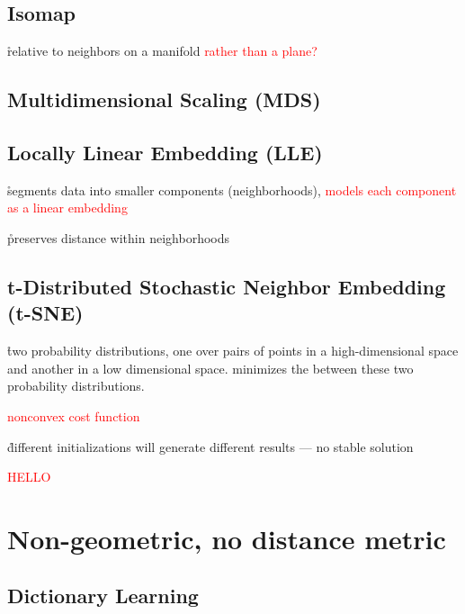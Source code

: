 \subsection{Isomap}


\r{relative to neighbors on a manifold \textcolor{red}{rather than a plane?}}

\subsection{Multidimensional Scaling (MDS)}


\subsection{Locally Linear Embedding (LLE)}

\r{segments data into smaller components (neighborhoods), \textcolor{red}{models each component as a linear embedding}}

\r{preserves distance within neighborhoods}


\subsection{t-Distributed Stochastic Neighbor Embedding (t-SNE)}




\r{two probability distributions, one over pairs of points in a high-dimensional space and another in a low dimensional space. minimizes the  between these two probability distributions.}


\textcolor{red}{nonconvex cost function}

\r{different initializations will generate different results --- no stable solution}

\textcolor{red}{HELLO}

\section{Non-geometric, no distance metric}

\subsection{Dictionary Learning}

